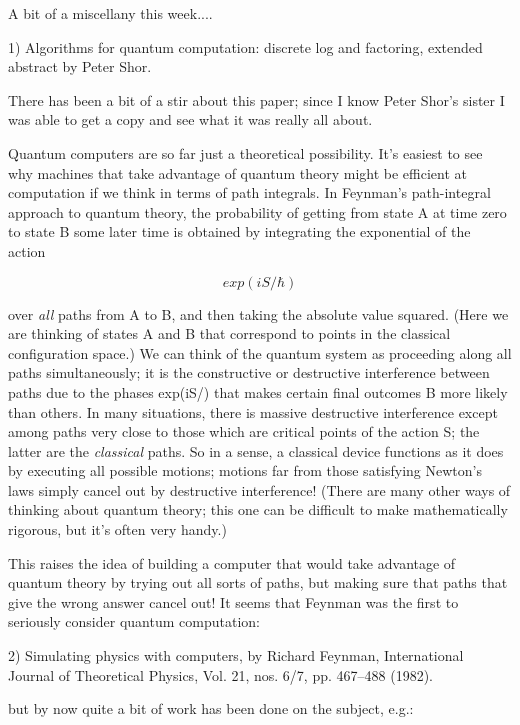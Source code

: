 

A bit of a miscellany this week....

1) Algorithms for quantum computation: discrete log and factoring,
extended abstract by Peter Shor.

There has been a bit of a stir about this paper; since I know Peter
Shor's sister I was able to get a copy and see what it was really all
about.  

Quantum computers are so far just a theoretical possibility.  It's
easiest to see why machines that take advantage of quantum theory might
be efficient at computation if we think in terms of path integrals.  In
Feynman's path-integral approach to quantum theory, the probability of
getting from state A at time zero to state B some later time is obtained
by integrating the exponential of the action

$$
                        exp(iS/\hbar ) 
$$
    

over \emph{all} paths from A to B, and then taking the absolute value
squared.  (Here we are thinking of states A and B that correspond to
points in the classical configuration space.)  We can think of the
quantum system as proceeding along all paths simultaneously; it is the
constructive or destructive interference between paths due to the phases
exp(iS/\hbar ) that makes certain final outcomes B more likely than
others.  In many situations, there is massive destructive interference
except among paths very close to those which are critical points of the
action S; the latter are the \emph{classical} paths.  So in a sense, a
classical device functions as it does by executing all possible motions;
motions far from those satisfying Newton's laws simply cancel out by
destructive interference!  (There are many other ways of thinking about
quantum theory; this one can be difficult to make mathematically
rigorous, but it's often very handy.)  

This raises the idea of building a computer that would take advantage of
quantum theory by trying out all sorts of paths, but making sure that
paths that give the wrong answer cancel out!  It seems that Feynman was
the first to seriously consider quantum computation:

2) Simulating physics with computers, by Richard Feynman, 
International Journal of Theoretical Physics, Vol. 21, nos. 6/7, 
pp. 467--488 (1982).

but by now quite a bit of work has been done on the subject, e.g.:

